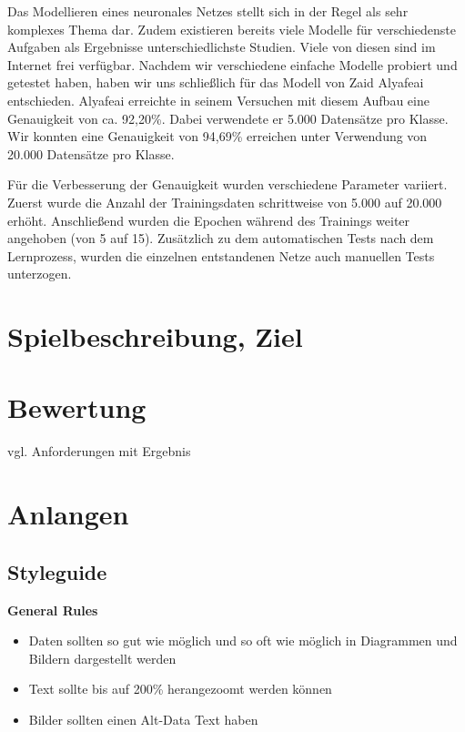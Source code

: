 \documentclass[11pt]{article}
\begin{document}
Das Modellieren eines neuronales Netzes stellt sich in der Regel als sehr komplexes Thema dar. Zudem existieren bereits viele Modelle für verschiedenste Aufgaben als Ergebnisse unterschiedlichste Studien. Viele von diesen sind im Internet frei verfügbar. Nachdem wir verschiedene einfache Modelle probiert und getestet haben, haben wir uns schließlich für das Modell von Zaid Alyafeai\parencite{ZaidAlyafeai2018} entschieden. Alyafeai erreichte in seinem Versuchen mit diesem Aufbau eine Genauigkeit von ca. 92,20\%. Dabei verwendete er 5.000 Datensätze pro Klasse. Wir konnten eine Genauigkeit von   94,69\% erreichen unter Verwendung von 20.000 Datensätze pro Klasse.

Für die Verbesserung der Genauigkeit wurden verschiedene Parameter variiert. Zuerst wurde die Anzahl der Trainingsdaten schrittweise von 5.000 auf 20.000 erhöht. Anschließend wurden die Epochen während des Trainings weiter angehoben (von 5 auf 15). 
Zusätzlich zu dem automatischen Tests nach dem Lernprozess, wurden die einzelnen entstandenen Netze auch manuellen Tests unterzogen.

\section{Spielbeschreibung, Ziel}

\section{Bewertung}
vgl. Anforderungen mit Ergebnis
\pagebreak

\section{Anlangen}
\label{chap: Anlagen}
\subsection{Styleguide}


\textbf{General Rules}
\begin{itemize}
\item Daten sollten so gut wie möglich und so oft wie möglich in Diagrammen und Bildern dargestellt werden
\item Text sollte bis auf 200\% herangezoomt werden können \item Bilder sollten einen Alt-Data Text haben\\
\end{itemize}
\end{document}
